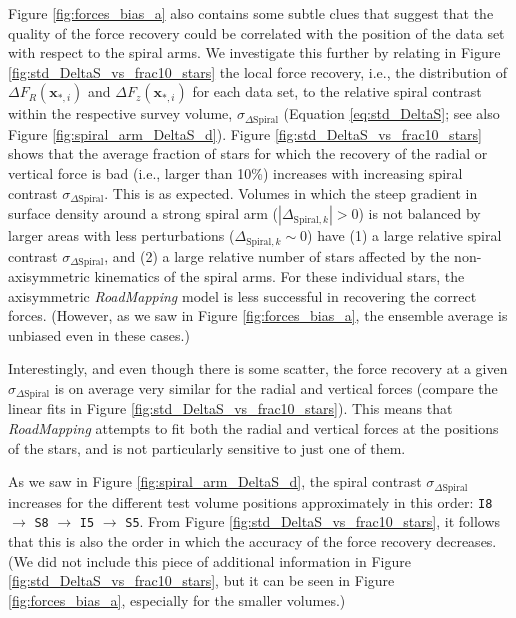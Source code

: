 \documentclass[iop,revtex4,numberedappendix,appendixfloats]{emulateapj}
\newcommand{\vect}[1]{\boldsymbol{#1}}
\newcommand{\RM}{{\sl RoadMapping}}
\begin{document}
Figure \ref{fig:forces_bias_a} also contains some subtle clues that suggest that the quality of the force recovery could be correlated with the position of the data set with respect to the spiral arms. We investigate this further by relating in Figure \ref{fig:std_DeltaS_vs_frac10_stars} the local force recovery, i.e., the distribution of $\Delta F_R(\vect{x}_{*,i})$ and $\Delta F_z(\vect{x}_{*,i})$ for each data set, to the relative spiral contrast within the respective survey volume, $\sigma_{\Delta \text{Spiral}}$ (Equation \eqref{eq:std_DeltaS}; see also Figure \ref{fig:spiral_arm_DeltaS_d}). Figure \ref{fig:std_DeltaS_vs_frac10_stars} shows that the average fraction of stars for which the recovery of the radial or vertical force is bad (i.e., larger than 10\%) increases with increasing spiral contrast $\sigma_{\Delta\text{Spiral}}$. This is as expected. Volumes in which the steep gradient in surface density around a strong spiral arm ($|\Delta_{\text{Spiral},k}| > 0$) is not balanced by larger areas with less perturbations ($\Delta_{\text{Spiral},k} \sim 0$) have (1) a large relative spiral contrast $\sigma_{\Delta\text{Spiral}}$, and (2) a large relative number of stars affected by the non-axisymmetric kinematics of the spiral arms. For these individual stars, the axisymmetric \RM{} model is less successful in recovering the correct forces. (However, as we saw in Figure \ref{fig:forces_bias_a}, the ensemble average is unbiased even in these cases.)

Interestingly, and even though there is some scatter, the force recovery at a given $\sigma_{\Delta\text{Spiral}}$ is on average very similar for the radial and vertical forces (compare the linear fits in Figure \ref{fig:std_DeltaS_vs_frac10_stars}). This means that \RM{} attempts to fit both the radial and vertical forces at the positions of the stars, and is not particularly sensitive to just one of them.

As we saw in Figure \ref{fig:spiral_arm_DeltaS_d}, the spiral contrast $\sigma_{\Delta \text{Spiral}}$ increases for the different test volume positions approximately in this order: \texttt{I8} $\longrightarrow$ \texttt{S8} $\longrightarrow$ \texttt{I5} $\longrightarrow$ \texttt{S5}. From Figure \ref{fig:std_DeltaS_vs_frac10_stars}, it follows that this is also the order in which the accuracy of the force recovery decreases. (We did not include this piece of additional information in Figure \ref{fig:std_DeltaS_vs_frac10_stars}, but it can be seen in Figure \ref{fig:forces_bias_a}, especially for the smaller volumes.)
\end{document}
